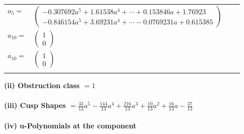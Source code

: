 \documentclass[1p]{elsarticle_modified}
\theoremstyle{definition}
\begin{document}
\begin{tabular}{m{7pt} m{180pt} m{7pt} m{180pt} }
\flushright $a_{5}=$&$\begin{pmatrix}-0.307692 a^{5}+1.61538 a^{4}+\cdots+0.153846 a+1.76923\\-0.846154 a^{5}+3.69231 a^{4}+\cdots-0.0769231 a+0.615385\end{pmatrix}$ \\
\flushright $a_{10}=$&$\begin{pmatrix}1\\0\end{pmatrix}$\\ \flushright $a_{10}=$&$\begin{pmatrix}1\\0\end{pmatrix}$\\&\end{tabular}
\flushleft \textbf{(ii) Obstruction class $= 1$}\\~\\
\flushleft \textbf{(iii) Cusp Shapes $= \frac{33}{13} a^5-\frac{144}{13} a^4+\frac{216}{13} a^3+\frac{10}{13} a^2+\frac{16}{13} a-\frac{37}{13}$}\\~\\
\newpage\renewcommand{\arraystretch}{1}
\flushleft \textbf{(iv) u-Polynomials at the component}\newline \\
\end{document}
